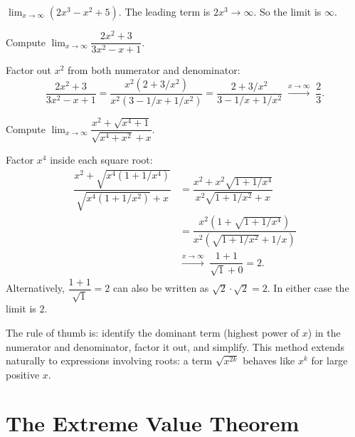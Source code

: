 \begin{example}
\label{ex:2-18}
$\displaystyle\lim_{x \to \infty} (2x^{3} - x^{2} + 5)$.  The leading term is $2x^{3} \to \infty$.  So the limit is $\infty$.
\end{example}

\begin{example}
\label{ex:2-19}
Compute $\displaystyle\lim_{x \to \infty} \dfrac{2x^{2} + 3}{3x^{2} - x + 1}$.

Factor out $x^{2}$ from both numerator and denominator:
\[
  \dfrac{2x^{2} + 3}{3x^{2} - x + 1}
  = \dfrac{x^{2}(2 + 3/x^{2})}{x^{2}(3 - 1/x + 1/x^{2})}
  = \dfrac{2 + 3/x^{2}}{3 - 1/x + 1/x^{2}}
  \;\xrightarrow{x \to \infty}\; \dfrac{2}{3}.
\]
\end{example}

\begin{example}
\label{ex:2-20}
Compute $\displaystyle\lim_{x \to \infty} \dfrac{x^{2} + \sqrt{x^{4} + 1}}{\sqrt{x^{4} + x^{2}} + x}$.

Factor $x^{4}$ inside each square root:
\begin{align*}
  \dfrac{x^{2} + \sqrt{x^{4}(1 + 1/x^{4})}}{\sqrt{x^{4}(1 + 1/x^{2})} + x}
  &= \dfrac{x^{2} + x^{2}\sqrt{1 + 1/x^{4}}}{x^{2}\sqrt{1 + 1/x^{2}} + x} \\
  &= \dfrac{x^{2}\!\left(1 + \sqrt{1 + 1/x^{4}}\right)}{x^{2}\!\left(\sqrt{1 + 1/x^{2}} + 1/x\right)} \\
  &\xrightarrow{x \to \infty}\; \dfrac{1 + 1}{\sqrt{1} + 0} = 2.
\end{align*}
Alternatively, $\dfrac{1+1}{\sqrt{1}} = 2$ can also be written as $\sqrt{2} \cdot \sqrt{2} = 2$.  In either case the limit is $2$.
\end{example}

\begin{remark}
The rule of thumb is: identify the dominant term (highest power of $x$) in the numerator and denominator, factor it out, and simplify.  This method extends naturally to expressions involving roots: a term $\sqrt{x^{2k}}$ behaves like $x^{k}$ for large positive $x$.
\end{remark}

\section{The Extreme Value Theorem}
\label{sec:2.21}


